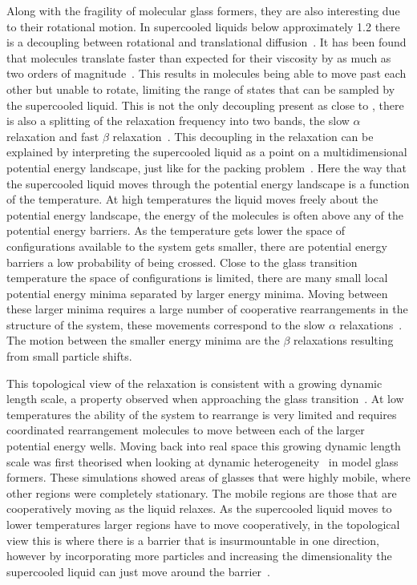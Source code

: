 Along with the fragility of molecular glass formers, they are also interesting due to their rotational motion. In supercooled liquids below approximately \SI{1.2}{\Tg} there is a decoupling between rotational and translational diffusion~\cite{debenedetti:01,stillinger:95}. It has been found that molecules translate faster than expected for their viscosity by as much as two orders of magnitude~\cite{debenedetti:01}. This results in molecules being able to move past each other but unable to rotate, limiting the range of states that can be sampled by the supercooled liquid. This is not the only decoupling present as close to \si{\Tg}, there is also a splitting of the relaxation frequency into two bands, the slow $\alpha$ relaxation and fast $\beta$ relaxation~\tocite. This decoupling in the relaxation can be explained by interpreting the supercooled liquid as a point on a multidimensional potential energy landscape, just like for the packing problem~. Here the way that the supercooled liquid moves through the potential energy landscape is a function of the temperature. At high temperatures the liquid moves freely about the potential energy landscape, the energy of the molecules is often above any of the potential energy barriers. As the temperature gets lower the space of configurations available to the system gets smaller, there are potential energy barriers a low probability of being crossed. Close to the glass transition temperature the space of configurations is limited, there are many small local potential energy minima separated by larger energy minima. Moving between these larger minima requires a large number of cooperative rearrangements in the structure of the system, these movements correspond to the slow $\alpha$ relaxations~. The motion between the smaller energy minima are the $\beta$ relaxations resulting from small particle shifts.

\begin{figure}
    \centering
    \caption{}
    \label{fig:pe landscape}
\end{figure}

This topological view of the relaxation is consistent with a growing dynamic length scale, a property observed when approaching the glass transition~\cite{berthier:05}. At low temperatures the ability of the system to rearrange is very limited and requires coordinated rearrangement molecules to move between each of the larger potential energy wells. Moving back into real space this growing dynamic length scale was first theorised when looking at dynamic heterogeneity~\cite{hurley:95} in model glass formers. These simulations showed areas of glasses that were highly mobile, where other regions were completely stationary. The mobile regions are those that are cooperatively moving as the liquid relaxes. As the supercooled liquid moves to lower temperatures larger regions have to move cooperatively, in the topological view this is where there is a barrier that is insurmountable in one direction, however by incorporating more particles and increasing the dimensionality the supercooled liquid can just move around the barrier~.

